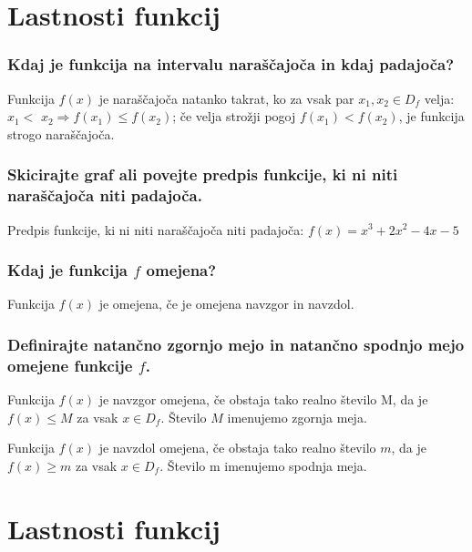 \documentclass{article}
\begin{document}
\section{Lastnosti funkcij}
\subsubsection*{Kdaj je funkcija na intervalu naraščajoča in kdaj padajoča?}

Funkcija $f(x)$ je naraščajoča natanko takrat, ko za vsak par $x_{1}, x_{2} \in D_{f}$ velja: $x_{1}<$ $x_{2} \Rightarrow f\left(x_{1}\right) \leq f\left(x_{2}\right)$; če velja strožji pogoj $f\left(x_{1}\right)<f\left(x_{2}\right)$, je funkcija strogo naraščajoča.

\subsubsection*{Skicirajte graf ali povejte predpis funkcije, ki ni niti naraščajoča niti padajoča.}
Predpis funkcije, ki ni niti naraščajoča niti padajoča: $f(x)=x^{3}+2 x^{2}-4 x-5$




\subsubsection*{Kdaj je funkcija $f$ omejena?}

Funkcija $f(x)$ je omejena, če je omejena navzgor in navzdol.

\subsubsection*{Definirajte natančno zgornjo mejo in natančno spodnjo mejo omejene funkcije $f$.}

Funkcija $f(x)$ je navzgor omejena, če obstaja tako realno število $\mathrm{M}$, da je $f(x) \leq M$ za vsak $x \in D_{f}$. Število $M$ imenujemo zgornja meja.

Funkcija $f(x)$ je navzdol omejena, če obstaja tako realno število $m$, da je $f(x) \geq m$ za vsak $x \in D_{f}$. Število m imenujemo spodnja meja.

\section{Lastnosti funkcij}
\end{document}
